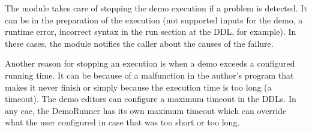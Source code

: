 The module takes care of stopping the demo execution if a problem is detected. It can be in the preparation of the execution (not supported inputs for the demo, a runtime error, incorrect syntax in the run section at the DDL, for example). In these cases, the module notifies the caller about the causes of the failure.

Another reason for stopping an execution is when a demo exceeds a configured running time. It can be because of a malfunction in the author's program that makes it never finish or simply because the execution time is too long (a timeout). The demo editors can configure a maximum timeout in the DDLs. In any cae, the DemoRunner has its own maximum timeout which can override what the user configured in case that was too short or too long.
